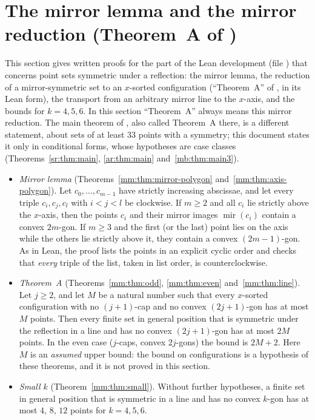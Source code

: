 \section{The mirror lemma and the mirror reduction (Theorem~A of \texorpdfstring{}{MIRRORETV})}\label{mm:sec}
\begingroup\setlength{\emergencystretch}{0.5\linewidth}

This section gives written proofs for the part of the Lean development 
(file ) that concerns point sets symmetric under a reflection:
the mirror lemma, the reduction of a mirror-symmetric set to an $x$-sorted configuration (``Theorem~A''
of , in its Lean form), the transport from an arbitrary mirror line to the
$x$-axis, and the bounds for $k=4,5,6$. In this section ``Theorem~A'' always means this mirror reduction.
The main theorem of , also called Theorem~A there, is a different statement,
about sets of at least $33$ points with a symmetry; this document states it only in conditional forms,
whose hypotheses are case classes (Theorems~\ref{sr:thm:main}, \ref{ar:thm:main} and~\ref{mb:thm:main3}).
\begin{itemize}
\item \emph{Mirror lemma} (Theorems~\ref{mm:thm:mirror-polygon} and~\ref{mm:thm:axis-polygon}). Let
  $c_0,\dots,c_{m-1}$ have strictly increasing abscissae, and let every triple $c_i,c_j,c_l$ with $i<j<l$
  be clockwise. If $m\ge2$ and all $c_i$ lie strictly above the $x$-axis, then the points $c_i$ and their
  mirror images $\operatorname{mir}(c_i)$ contain a convex $2m$-gon. If $m\ge3$ and the first (or the
  last) point lies on the axis while the others lie strictly above it, they contain a convex
  $(2m-1)$-gon. As in Lean, the proof lists the points in an explicit cyclic order and checks that
  \emph{every} triple of the list, taken in list order, is counterclockwise.
\item \emph{Theorem~A} (Theorems~\ref{mm:thm:odd}, \ref{mm:thm:even} and~\ref{mm:thm:line}). Let $j\ge2$,
  and let $M$ be a natural number such that every $x$-sorted configuration with no $(j+1)$-cap and no
  convex $(2j+1)$-gon has at most $M$ points. Then every finite set in general position that is
  symmetric under the reflection in a line and has no convex $(2j+1)$-gon has at most $2M$ points. In
  the even case ($j$-caps, convex $2j$-gons) the bound is $2M+2$. Here $M$ is an \emph{assumed} upper
  bound: the bound on configurations is a hypothesis of these theorems, and it is not proved in this
  section.
\item \emph{Small $k$} (Theorem~\ref{mm:thm:small}). Without further hypotheses, a finite set in general
  position that is symmetric in a line and has no convex $k$-gon has at most $4$, $8$, $12$ points for
  $k=4,5,6$.
\end{itemize}

